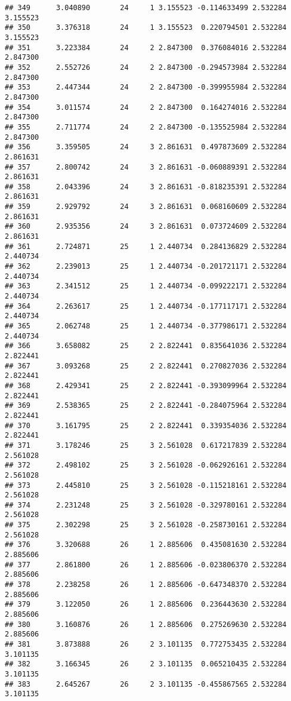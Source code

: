\documentclass[]{book}
\theoremstyle{definition}
\theoremstyle{definition}
\theoremstyle{definition}
\theoremstyle{remark}
\begin{document}
\begin{verbatim}
## 349      3.040890       24     1 3.155523 -0.114633499 2.532284 3.155523
## 350      3.376318       24     1 3.155523  0.220794501 2.532284 3.155523
## 351      3.223384       24     2 2.847300  0.376084016 2.532284 2.847300
## 352      2.552726       24     2 2.847300 -0.294573984 2.532284 2.847300
## 353      2.447344       24     2 2.847300 -0.399955984 2.532284 2.847300
## 354      3.011574       24     2 2.847300  0.164274016 2.532284 2.847300
## 355      2.711774       24     2 2.847300 -0.135525984 2.532284 2.847300
## 356      3.359505       24     3 2.861631  0.497873609 2.532284 2.861631
## 357      2.800742       24     3 2.861631 -0.060889391 2.532284 2.861631
## 358      2.043396       24     3 2.861631 -0.818235391 2.532284 2.861631
## 359      2.929792       24     3 2.861631  0.068160609 2.532284 2.861631
## 360      2.935356       24     3 2.861631  0.073724609 2.532284 2.861631
## 361      2.724871       25     1 2.440734  0.284136829 2.532284 2.440734
## 362      2.239013       25     1 2.440734 -0.201721171 2.532284 2.440734
## 363      2.341512       25     1 2.440734 -0.099222171 2.532284 2.440734
## 364      2.263617       25     1 2.440734 -0.177117171 2.532284 2.440734
## 365      2.062748       25     1 2.440734 -0.377986171 2.532284 2.440734
## 366      3.658082       25     2 2.822441  0.835641036 2.532284 2.822441
## 367      3.093268       25     2 2.822441  0.270827036 2.532284 2.822441
## 368      2.429341       25     2 2.822441 -0.393099964 2.532284 2.822441
## 369      2.538365       25     2 2.822441 -0.284075964 2.532284 2.822441
## 370      3.161795       25     2 2.822441  0.339354036 2.532284 2.822441
## 371      3.178246       25     3 2.561028  0.617217839 2.532284 2.561028
## 372      2.498102       25     3 2.561028 -0.062926161 2.532284 2.561028
## 373      2.445810       25     3 2.561028 -0.115218161 2.532284 2.561028
## 374      2.231248       25     3 2.561028 -0.329780161 2.532284 2.561028
## 375      2.302298       25     3 2.561028 -0.258730161 2.532284 2.561028
## 376      3.320688       26     1 2.885606  0.435081630 2.532284 2.885606
## 377      2.861800       26     1 2.885606 -0.023806370 2.532284 2.885606
## 378      2.238258       26     1 2.885606 -0.647348370 2.532284 2.885606
## 379      3.122050       26     1 2.885606  0.236443630 2.532284 2.885606
## 380      3.160876       26     1 2.885606  0.275269630 2.532284 2.885606
## 381      3.873888       26     2 3.101135  0.772753435 2.532284 3.101135
## 382      3.166345       26     2 3.101135  0.065210435 2.532284 3.101135
## 383      2.645267       26     2 3.101135 -0.455867565 2.532284 3.101135

\end{verbatim}
\end{document}
